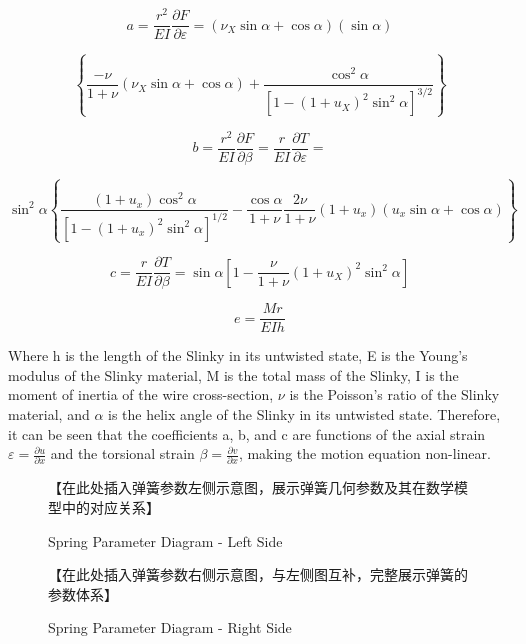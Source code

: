 \documentclass{mcmthesis}  %
\begin{document}
\begin{appendices}
\begin{equation}
a = \frac{r^2}{EI}\frac{\partial F}{\partial \varepsilon} = (\nu_X \sin \alpha + \cos \alpha)(\sin \alpha)
\end{equation}

\begin{equation}
\left\{
\frac{-\nu}{1+\nu}(\nu_X \sin \alpha + \cos \alpha) + \frac{\cos^2 \alpha}{\left[1-(1+u_X)^2\sin^2 \alpha\right]^{3/2}} 
\right\}
\end{equation}

\begin{equation}
b = \frac{r^2}{EI}\frac{\partial F}{\partial \beta} = \frac{r}{EI}\frac{\partial T}{\partial \varepsilon} =
\end{equation}

\begin{equation}
\sin^2 \alpha \left\{
\frac{(1+u_x)\cos^2 \alpha}{\left[1-(1+u_x)^2\sin^2\alpha\right]^{1/2}} - \frac{\cos\alpha}{1+\nu} \frac{2\nu}{1+\nu}(1+u_x)(u_x\sin\alpha+\cos\alpha)
\right\}
\end{equation}

\begin{equation}
c = \frac{r}{EI}\frac{\partial T}{\partial \beta} = \sin\alpha \left[1-\frac{\nu}{1+\nu}(1+u_X)^2\sin^2\alpha\right]
\end{equation}

\begin{equation}
e = \frac{Mr}{EIh}
\end{equation}

Where h is the length of the Slinky in its untwisted state, E is the Young's modulus of the Slinky material, M is the total mass of the Slinky, I is the moment of inertia of the wire cross-section, $\nu$ is the Poisson's ratio of the Slinky material, and $\alpha$ is the helix angle of the Slinky in its untwisted state. Therefore, it can be seen that the coefficients a, b, and c are functions of the axial strain $\varepsilon = \frac{\partial u}{\partial x}$ and the torsional strain $\beta = \frac{\partial v}{\partial x}$, making the motion equation non-linear.

\begin{figure}[h!]
    \centering
    【在此处插入弹簧参数左侧示意图，展示弹簧几何参数及其在数学模型中的对应关系】
    \caption{Spring Parameter Diagram - Left Side}
    \label{fig:spring_params_left}
\end{figure}

\begin{figure}[h!]
    \centering
    【在此处插入弹簧参数右侧示意图，与左侧图互补，完整展示弹簧的参数体系】
    \caption{Spring Parameter Diagram - Right Side}
    \label{fig:spring_params_right}
\end{figure}


\end{appendices}
\end{document}
